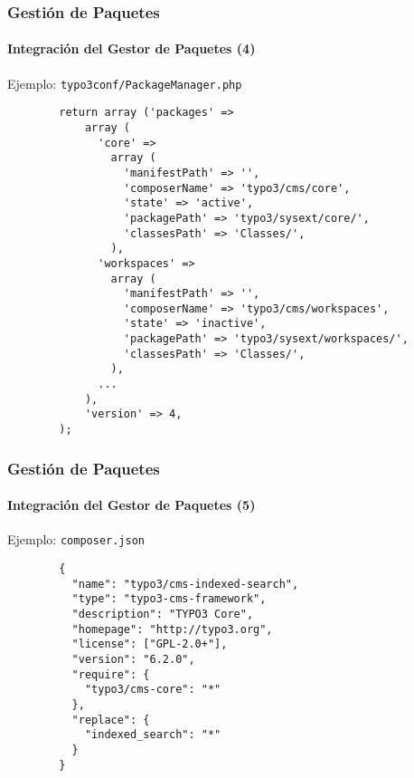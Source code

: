 \begin{frame}[fragile]
	\frametitle{Gestión de Paquetes}
	\framesubtitle{Integración del Gestor de Paquetes (4)}

	Ejemplo: \texttt{typo3conf/PackageManager.php}

	\lstset{
		basicstyle=\tiny\ttfamily
	}

	\begin{lstlisting}
		return array ('packages' =>
		    array (
		      'core' =>
		        array (
		          'manifestPath' => '',
		          'composerName' => 'typo3/cms/core',
		          'state' => 'active',
		          'packagePath' => 'typo3/sysext/core/',
		          'classesPath' => 'Classes/',
		        ),
		      'workspaces' =>
		        array (
		          'manifestPath' => '',
		          'composerName' => 'typo3/cms/workspaces',
		          'state' => 'inactive',
		          'packagePath' => 'typo3/sysext/workspaces/',
		          'classesPath' => 'Classes/',
		        ),
		      ...
		    ),
		    'version' => 4,
		);
	\end{lstlisting}

\end{frame}


\begin{frame}[fragile]
	\frametitle{Gestión de Paquetes}
	\framesubtitle{Integración del Gestor de Paquetes (5)}

	Ejemplo: \texttt{composer.json}

	\lstset{
		basicstyle=\tiny\ttfamily
	}

	\begin{lstlisting}
		{
		  "name": "typo3/cms-indexed-search",
		  "type": "typo3-cms-framework",
		  "description": "TYPO3 Core",
		  "homepage": "http://typo3.org",
		  "license": ["GPL-2.0+"],
		  "version": "6.2.0",
		  "require": {
		    "typo3/cms-core": "*"
		  },
		  "replace": {
		    "indexed_search": "*"
		  }
		}
	\end{lstlisting}

\end{frame}



